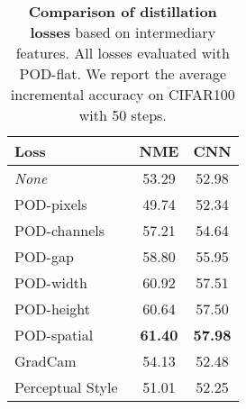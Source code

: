 \begin{table*}
    \centering
    \begin{tabular}{@{}lcc@{}}
        \toprule
        Loss                                                        & NME            & CNN            \\
        \midrule
        \textit{None}                                               & 53.29          & 52.98          \\
        POD-pixels                                                  & 49.74          & 52.34          \\
        POD-channels                                                & 57.21          & 54.64          \\
        POD-gap                                                     & 58.80          & 55.95          \\
        POD-width                                                   & 60.92          & 57.51          \\
        POD-height                                                  & 60.64          & 57.50          \\
        POD-spatial                                                 & \textbf{61.40} & \textbf{57.98} \\
        \cmidrule{1-3}
        GradCam~\citep{dhar2019learning_without_memorizing_gradcam} & 54.13          & 52.48          \\
        Perceptual Style~\citep{johnson2016perceptual_losses}       & 51.01          & 52.25          \\
        \bottomrule
    \end{tabular}
    \caption{\textbf{Comparison of distillation losses} based on intermediary features. All losses evaluated
        with POD-flat. We report the average incremental accuracy on CIFAR100 with 50 steps.}
    \label{tab:podnet_ablation_perceptual}
\end{table*}
